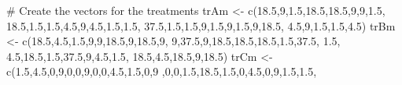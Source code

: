 \documentclass[
  letterpaper,
]{book}
\newenvironment{Shaded}{\begin{snugshade}}{\end{snugshade}}
\newcommand{\CommentTok}[1]{\textcolor[rgb]{0.37,0.37,0.37}{#1}}
\newcommand{\DecValTok}[1]{\textcolor[rgb]{0.68,0.00,0.00}{#1}}
\newcommand{\FloatTok}[1]{\textcolor[rgb]{0.68,0.00,0.00}{#1}}
\newcommand{\FunctionTok}[1]{\textcolor[rgb]{0.28,0.35,0.67}{#1}}
\newcommand{\NormalTok}[1]{\textcolor[rgb]{0.00,0.23,0.31}{#1}}
\newcommand{\OtherTok}[1]{\textcolor[rgb]{0.00,0.23,0.31}{#1}}
\begin{document}
\begin{Shaded}
\begin{Highlighting}[]
\CommentTok{\# Create the vectors for the treatments}
\NormalTok{trAm }\OtherTok{\textless{}{-}} \FunctionTok{c}\NormalTok{(}\FloatTok{18.5}\NormalTok{,}\DecValTok{9}\NormalTok{,}\FloatTok{1.5}\NormalTok{,}\FloatTok{18.5}\NormalTok{,}\FloatTok{18.5}\NormalTok{,}\DecValTok{9}\NormalTok{,}\DecValTok{9}\NormalTok{,}\FloatTok{1.5}\NormalTok{,}
          \FloatTok{18.5}\NormalTok{,}\FloatTok{1.5}\NormalTok{,}\FloatTok{1.5}\NormalTok{,}\FloatTok{4.5}\NormalTok{,}\DecValTok{9}\NormalTok{,}\FloatTok{4.5}\NormalTok{,}\FloatTok{1.5}\NormalTok{,}\FloatTok{1.5}\NormalTok{,}
          \FloatTok{37.5}\NormalTok{,}\FloatTok{1.5}\NormalTok{,}\FloatTok{1.5}\NormalTok{,}\DecValTok{9}\NormalTok{,}\FloatTok{1.5}\NormalTok{,}\DecValTok{9}\NormalTok{,}\FloatTok{1.5}\NormalTok{,}\DecValTok{9}\NormalTok{,}\FloatTok{18.5}\NormalTok{,}
          \FloatTok{4.5}\NormalTok{,}\DecValTok{9}\NormalTok{,}\FloatTok{1.5}\NormalTok{,}\FloatTok{1.5}\NormalTok{,}\FloatTok{4.5}\NormalTok{)}
\NormalTok{trBm }\OtherTok{\textless{}{-}} \FunctionTok{c}\NormalTok{(}\FloatTok{18.5}\NormalTok{,}\FloatTok{4.5}\NormalTok{,}\FloatTok{1.5}\NormalTok{,}\DecValTok{9}\NormalTok{,}\DecValTok{9}\NormalTok{,}\FloatTok{18.5}\NormalTok{,}\DecValTok{9}\NormalTok{,}\FloatTok{18.5}\NormalTok{,}\DecValTok{9}\NormalTok{,}
          \DecValTok{9}\NormalTok{,}\FloatTok{37.5}\NormalTok{,}\DecValTok{9}\NormalTok{,}\FloatTok{18.5}\NormalTok{,}\FloatTok{18.5}\NormalTok{,}\FloatTok{18.5}\NormalTok{,}\FloatTok{1.5}\NormalTok{,}\FloatTok{37.5}\NormalTok{,}
          \FloatTok{1.5}\NormalTok{, }\FloatTok{4.5}\NormalTok{,}\FloatTok{18.5}\NormalTok{,}\FloatTok{1.5}\NormalTok{,}\FloatTok{37.5}\NormalTok{,}\DecValTok{9}\NormalTok{,}\FloatTok{4.5}\NormalTok{,}\FloatTok{1.5}\NormalTok{,}
          \FloatTok{18.5}\NormalTok{,}\FloatTok{4.5}\NormalTok{,}\FloatTok{18.5}\NormalTok{,}\DecValTok{9}\NormalTok{,}\FloatTok{18.5}\NormalTok{)}
\NormalTok{trCm }\OtherTok{\textless{}{-}} \FunctionTok{c}\NormalTok{(}\FloatTok{1.5}\NormalTok{,}\FloatTok{4.5}\NormalTok{,}\DecValTok{0}\NormalTok{,}\DecValTok{9}\NormalTok{,}\DecValTok{0}\NormalTok{,}\DecValTok{0}\NormalTok{,}\DecValTok{9}\NormalTok{,}\DecValTok{0}\NormalTok{,}\DecValTok{0}\NormalTok{,}\FloatTok{4.5}\NormalTok{,}\FloatTok{1.5}\NormalTok{,}\DecValTok{0}\NormalTok{,}\DecValTok{9}
\NormalTok{          ,}\DecValTok{0}\NormalTok{,}\DecValTok{0}\NormalTok{,}\FloatTok{1.5}\NormalTok{,}\FloatTok{18.5}\NormalTok{,}\FloatTok{1.5}\NormalTok{,}\DecValTok{0}\NormalTok{,}\FloatTok{4.5}\NormalTok{,}\DecValTok{0}\NormalTok{,}\DecValTok{9}\NormalTok{,}\FloatTok{1.5}\NormalTok{,}\FloatTok{1.5}\NormalTok{,}

\end{Highlighting}
\end{Shaded}
\end{document}
